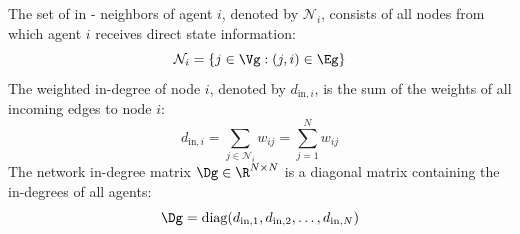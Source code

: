 \begin{definition}\label{def:neighbor_set}
The set of in - neighbors of agent $i$, denoted by $\mathcal{N}_i$, consists of all nodes from which agent $i$ receives direct state information:
\begin{equation}
    \mathcal{N}_i = \{j \in \Vg : (j, i) \in \Eg\}
\end{equation}
The weighted in-degree of node $i$, denoted by $d_{\text{in}, i}$, is the sum of the weights of all incoming edges to node $i$:
\begin{equation}
    d_{\text{in}, i} = \sum_{j \in \mathcal{N}_i} w_{ij} = \sum_{j=1}^{N} w_{ij}
\end{equation}
The network in-degree matrix $\Dg \in \R^{N \times N}$ is a diagonal matrix containing the in-degrees of all agents:
\begin{equation}\label{eq:indegree_matrix}
    \Dg = \text{diag}(d_{\text{in}, 1}, d_{\text{in}, 2}, \dots, d_{\text{in}, N})
\end{equation}
\end{definition}

